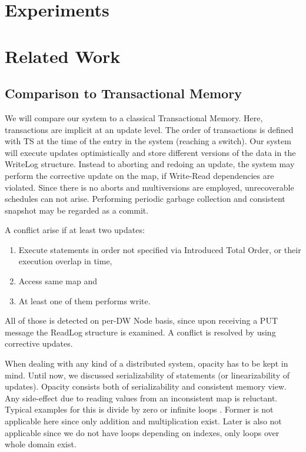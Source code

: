 \documentclass{sig-semester}
\begin{document}
\section{Experiments}
\label{sec:Experiments}
\vspace{2mm}

\section{Related Work}
\label{sec:Related}
\vspace{2mm}

\subsection{Comparison to Transactional Memory}
We will compare our system to a classical Transactional Memory. Here, transactions are implicit at an update level. The order of transactions is defined with TS at the time of the entry in the system (reaching a switch). Our system will execute updates optimistically and store different versions of the data in the WriteLog structure. Instead to aborting and redoing an update, the system may perform the corrective update on the map, if Write-Read dependencies are violated. Since there is no aborts and multiversions are employed, unrecoverable schedules can not arise. Performing periodic garbage collection and consistent snapshot may be regarded as a commit.

A conflict arise if at least two updates:
\begin{enumerate}[(1)]
 \item Execute statements in order not specified via Introduced Total Order, or their execution overlap in time, 
 \item Access same map and
 \item At least one of them performs write.
\end{enumerate}

All of those is detected on per-DW Node basis, since upon receiving a PUT message the ReadLog structure is examined. A conflict is resolved by using corrective updates.

When dealing with any kind of a distributed system, opacity has to be kept in mind. Until now, we discussed serializability of statements (or linearizability of updates). Opacity consists both of serializability and consistent memory view. Any side-effect due to reading values from an inconsistent map is reluctant. Typical examples for this is divide by zero or infinite loops \cite{Rachid08}. Former is not applicable here since only addition and multiplication exist. Later is also not applicable since we do not have loops depending on indexes, only loops over whole domain exist.
\end{document}
